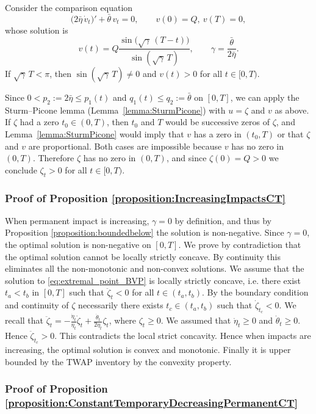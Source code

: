 \documentclass[final,3p,authoryear,12pt]{elsarticle}
\begin{document}
Consider the comparison equation
\[
\bigl(2\bar\eta\,\dot v_t\bigr)'+\bar\theta\,v_t=0,
\qquad v(0)=Q,\ v(T)=0,
\]
whose solution is
\[
v(t)=Q\frac{\sin\!\bigl(\sqrt{\gamma}\,(T-t)\bigr)}{\sin(\sqrt{\gamma}\,T)},
\qquad \gamma=\frac{\bar\theta}{2\bar\eta}.
\]
If $\sqrt{\gamma}\,T<\pi$, then $\sin(\sqrt{\gamma}\,T)\neq 0$ and $v(t)>0$ for
all $t\in[0,T)$.

Since $0<p_2:=2\bar\eta\le p_1(t)$ and $q_1(t)\le q_2:=\bar\theta$ on $[0,T]$,
we can apply the Sturm--Picone lemma (Lemma~\ref{lemma:SturmPicone}) with $u=\zeta$
and $v$ as above. If $\zeta$ had a zero $t_0\in(0,T)$, then $t_0$ and $T$ would
be successive zeros of $\zeta$, and Lemma~\ref{lemma:SturmPicone} would imply
that $v$ has a zero in $(t_0,T)$ or that $\zeta$ and $v$ are proportional. Both
cases are impossible because $v$ has no zero in $(0,T)$. Therefore $\zeta$ has
no zero in $(0,T)$, and since $\zeta(0)=Q>0$ we conclude $\zeta_t>0$ for all
$t\in[0,T)$.

\subsubsection{Proof of Proposition \ref{proposition:IncreasingImpactsCT}}

When permanent impact is increasing, $\gamma=0$ by definition, and thus by Proposition \ref{proposition:boundedbelow} the solution is non-negative. Since $\gamma=0$, the optimal solution is non-negative on $[0,T]$. We prove by contradiction that the optimal solution cannot be locally strictly concave. By continuity this eliminates all the non-monotonic and non-convex solutions. We assume that the solution to \ref{eq:extremal_point_BVP} is locally strictly concave, i.e. there exist $t_{a}<t_{b}$ in $[0,T]$ such that $\ddot \zeta_{t} < 0$ for all $t\in(t_{a},t_{b})$. By the boundary condition and continuity of $\zeta$ necessarily there exists $t_{c}\in(t_{a},t_{b})$ such that $\dot \zeta_{t_{c}} < 0$. We recall that $\ddot \zeta_{t} = -\frac{\dot \eta_{t}}{\eta_{t}}\dot \zeta_{t}+\frac{\dot \theta_{t}}{2\eta_{t}}\zeta_{t}$, where $\zeta_{t}\ge0$. We assumed that $\dot \eta_{t} \ge0$ and $\dot \theta_{t}\ge0$. Hence $\ddot \zeta_{t_{c}} > 0$. This contradicts the local strict concavity. Hence when impacts are increasing, the optimal solution is convex and monotonic. Finally it is upper bounded by the TWAP inventory by the convexity property. 

\subsubsection{Proof of Proposition \ref{proposition:ConstantTemporaryDecreasingPermanentCT}}
\end{document}
